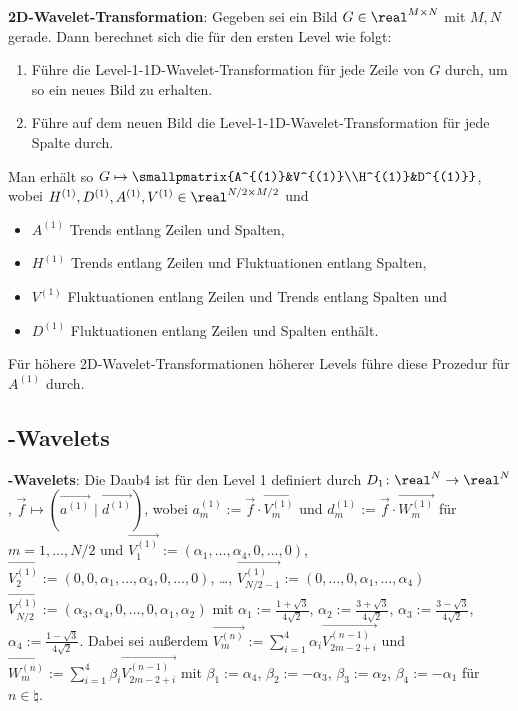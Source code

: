 \textbf{2D-Wavelet-Transformation}:
Gegeben sei ein Bild $G \in \real^{M \times N}$ mit $M, N$ gerade.
Dann berechnet sich die  für den ersten Level wie folgt:
\begin{enumerate}
    \item
    Führe die Level-1-1D-Wavelet-Transformation für jede Zeile von $G$ durch,
    um so ein neues Bild zu erhalten.

    \item
    Führe auf dem neuen Bild die Level-1-1D-Wavelet-Transformation für jede Spalte durch.
\end{enumerate}
Man erhält so $G \mapsto \smallpmatrix{A^{(1)}&V^{(1)}\\H^{(1)}&D^{(1)}}$,
wobei $H^{(1)}, D^{(1)}, A^{(1)}, V^{(1)} \in \real^{N/2 \times M/2}$ und
\begin{itemize}
    \item
    $A^{(1)}$ Trends entlang Zeilen und Spalten,

    \item
    $H^{(1)}$ Trends entlang Zeilen und Fluktuationen entlang Spalten,

    \item
    $V^{(1)}$ Fluktuationen entlang Zeilen und Trends entlang Spalten und

    \item
    $D^{(1)}$ Fluktuationen entlang Zeilen und Spalten enthält.
\end{itemize}
Für höhere 2D-Wavelet-Transformationen höherer Levels führe diese Prozedur für $A^{(1)}$ durch.

\subsection{%
    -Wavelets%
}

\textbf{-Wavelets}:
Die  Daub4 ist für den Level 1 definiert durch
$D_1\colon \real^N \to \real^N$, $\vec{f} \mapsto (\vec{a^{(1)}} \;|\; \vec{d^{(1)}})$,
wobei $a_m^{(1)} := \vec{f} \cdot \vec{V_m^{(1)}}$ und $d_m^{(1)} := \vec{f} \cdot \vec{W_m^{(1)}}$
für $m = 1, \dotsc, N/2$ und
$\vec{V_1^{(1)}} := (\alpha_1, \dotsc, \alpha_4, 0, \dotsc, 0)$,
$\vec{V_2^{(1)}} := (0, 0, \alpha_1, \dotsc, \alpha_4, 0, \dotsc, 0)$,
\dots,
$\vec{V_{N/2-1}^{(1)}} := (0, \dotsc, 0, \alpha_1, \dotsc, \alpha_4)$
$\vec{V_{N/2}^{(1)}} := (\alpha_3, \alpha_4, 0, \dotsc, 0, \alpha_1, \alpha_2)$
mit
$\alpha_1 := \frac{1 + \sqrt{3}}{4\sqrt{2}}$,
$\alpha_2 := \frac{3 + \sqrt{3}}{4\sqrt{2}}$,
$\alpha_3 := \frac{3 - \sqrt{3}}{4\sqrt{2}}$,
$\alpha_4 := \frac{1 - \sqrt{3}}{4\sqrt{2}}$.
Dabei sei außerdem
$\vec{V_m^{(n)}} := \sum_{i=1}^{4} \alpha_i \vec{V_{2m-2+i}^{(n-1)}}$ und\\
$\vec{W_m^{(n)}} := \sum_{i=1}^{4} \beta_i \vec{V_{2m-2+i}^{(n-1)}}$
mit
$\beta_1 := \alpha_4$,
$\beta_2 := -\alpha_3$,
$\beta_3 := \alpha_2$,
$\beta_4 := -\alpha_1$
für $n \in \natural$.

